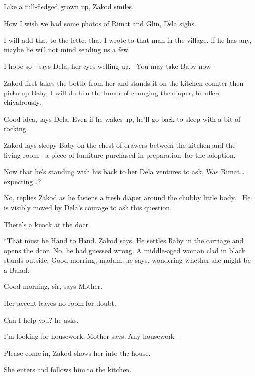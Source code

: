 \documentclass[letterpaper]{article}
\begin{document}
{\textquotedbl}Like a full-fledged grown up,{\textquotedbl} Zakod smiles. 

{\textquotedbl}How I wish we had some photos of Rimat and Glin,{\textquotedbl} Dela sighs.

{\textquotedbl}I will add that to the letter that I wrote to that man in the village. If he has any, maybe he will not
mind sending us a few.{\textquotedbl} 

{\textquotedbl}I hope so -{\textquotedbl} says Dela, her eyes welling up. ~{\textquotedbl}You may take Baby now
-{\textquotedbl} 

Zakod first takes the bottle from her and stands it on the kitchen counter then picks up Baby. {\textquotedbl}I will do
him the honor of changing the diaper,{\textquotedbl} he offers chivalrously.~

{\textquotedbl}Good idea,{\textquotedbl} says Dela. {\textquotedbl}Even if he wakes up, he'll go back to sleep with a
bit of rocking.{\textquotedbl} 

Zakod lays sleepy Baby on the chest of drawers between the kitchen and the living room - a piece of furniture purchased
in preparation~for the adoption.

Now that he's standing with his back to her Dela ventures to ask, {\textquotedbl}Was Rimat{\dots}
expecting{\dots}?{\textquotedbl} 

{\textquotedbl}No,{\textquotedbl} replies Zakod as he fastens a fresh diaper around the chubby little body.~ He is
visibly moved by Dela's courage to ask this question.

There's a knock at the door. 

{}``That must be Hand to Hand.{\textquotedbl} Zakod says. He settles Baby in the carriage and opens the door. No, he had
guessed wrong. A middle-aged{ }woman clad in black stands outside. {\textquotedbl}Good morning,
madam,{\textquotedbl} he says, wondering whether she might be a Balad.

{\textquotedbl}Good morning, sir,{\textquotedbl} says Mother. 

Her accent leaves no room for doubt.

{\textquotedbl}Can I help you?{\textquotedbl} he asks.

{\textquotedbl}I'm looking for housework,{\textquotedbl} Mother says. {\textquotedbl}Any housework -{\textquotedbl} 

{\textquotedbl}Please come in,{\textquotedbl} Zakod shows her into the house. 

She enters and follows him to the kitchen. 
\end{document}
